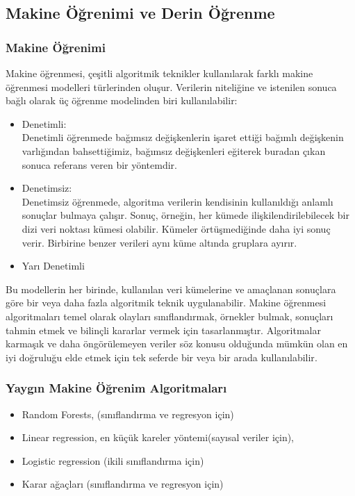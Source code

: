 \documentclass{article}
\begin{document}
\subsection{Makine Öğrenimi ve Derin Öğrenme }
\subsubsection{Makine Öğrenimi}
Makine öğrenmesi, çeşitli algoritmik teknikler kullanılarak farklı makine öğrenmesi modelleri türlerinden oluşur. Verilerin niteliğine ve istenilen sonuca bağlı olarak üç öğrenme modelinden biri kullanılabilir: 
\begin{itemize}
    \item Denetimli:
    \\Denetimli öğrenmede bağımsız değişkenlerin işaret ettiği bağımlı değişkenin varlığından bahsettiğimiz, bağımsız değişkenleri eğiterek buradan çıkan sonuca referans veren bir yöntemdir.
    \item Denetimsiz:
    \\Denetimsiz öğrenmede, algoritma verilerin kendisinin kullanıldığı anlamlı sonuçlar bulmaya çalışır. Sonuç, örneğin, her kümede ilişkilendirilebilecek bir dizi veri noktası kümesi olabilir. Kümeler örtüşmediğinde daha iyi sonuç verir. Birbirine benzer verileri aynı küme altında gruplara ayırır.
    \item Yarı Denetimli
\end{itemize}
Bu modellerin her birinde, kullanılan veri kümelerine ve amaçlanan sonuçlara göre bir veya daha fazla algoritmik teknik uygulanabilir. Makine öğrenmesi algoritmaları temel olarak olayları sınıflandırmak, örnekler bulmak, sonuçları tahmin etmek ve bilinçli kararlar vermek için tasarlanmıştır. Algoritmalar karmaşık ve daha öngörülemeyen veriler söz konusu olduğunda mümkün olan en iyi doğruluğu elde etmek için tek seferde bir veya bir arada kullanılabilir\cite{ml}.
\subsubsection{Yaygın Makine Öğrenim Algoritmaları}
\begin{itemize}
    \item Random Forests, (sınıflandırma ve regresyon için)
    \item Linear regression, en küçük kareler yöntemi(sayısal veriler için),
    \item Logistic regression (ikili sınıflandırma için)
    \item Karar ağaçları (sınıflandırma ve regresyon için)
\end{itemize}
\end{document}
